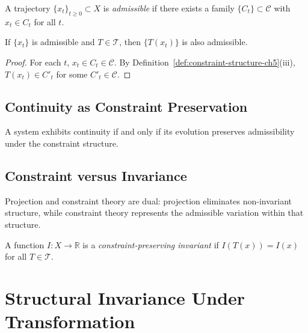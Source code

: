 \documentclass[11pt,openany]{book}
\begin{document}
\begin{definition}
A trajectory $\{x_t\}_{t \ge 0} \subset X$ is
\emph{admissible} if there exists a family $\{C_t\} \subset
\mathcal{C}$ with $x_t \in C_t$ for all $t$.
\end{definition}

\begin{proposition}
If $\{x_t\}$ is admissible and $T \in \mathcal{T}$, then
$\{T(x_t)\}$ is also admissible.
\end{proposition}

\begin{proof}
For each $t$, $x_t \in C_t \in \mathcal{C}$. By
Definition~\ref{def:constraint-structure-ch5}(iii),
$T(x_t) \in C'_t$ for some $C'_t \in \mathcal{C}$.
\end{proof}

\section{Continuity as Constraint Preservation}
\label{sec:continuity-constraint}

\begin{proposition}
\label{prop:continuity}
A system exhibits continuity if and only if its evolution
preserves admissibility under the constraint structure.
\end{proposition}

\section{Constraint versus Invariance}
\label{sec:constraint-vs-invariance}

\begin{proposition}[Duality]
Projection and constraint theory are dual: projection
eliminates non-invariant structure, while constraint theory
represents the admissible variation within that structure.
\end{proposition}

\begin{definition}
A function $I : X \to \mathbb{R}$ is a
\emph{constraint-preserving invariant} if $I(T(x)) = I(x)$
for all $T \in \mathcal{T}$.
\end{definition}


\chapter{Structural Invariance Under Transformation}
\label{ch:structural-invariance}
\end{document}
